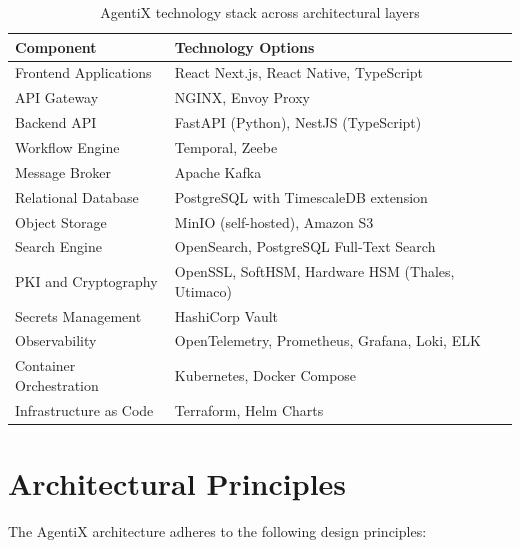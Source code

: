 \documentclass[12pt,oneside,openright,a4paper]{cpe-english-project}
\begin{document}
\begin{table}[h!]
\centering
\footnotesize
\renewcommand{\arraystretch}{1.3}
\begin{tabular}{|p{}|p{}|}
\hline
\textbf{Component} & \textbf{Technology Options} \\ \hline
Frontend Applications & React Next.js, React Native, TypeScript \\ \hline
API Gateway & NGINX, Envoy Proxy \\ \hline
Backend API & FastAPI (Python), NestJS (TypeScript) \\ \hline
Workflow Engine & Temporal, Zeebe \\ \hline
Message Broker & Apache Kafka \\ \hline
Relational Database & PostgreSQL with TimescaleDB extension \\ \hline
Object Storage & MinIO (self-hosted), Amazon S3 \\ \hline
Search Engine & OpenSearch, PostgreSQL Full-Text Search \\ \hline
PKI and Cryptography & OpenSSL, SoftHSM, Hardware HSM (Thales, Utimaco) \\ \hline
Secrets Management & HashiCorp Vault \\ \hline
Observability & OpenTelemetry, Prometheus, Grafana, Loki, ELK \\ \hline
Container Orchestration & Kubernetes, Docker Compose \\ \hline
Infrastructure as Code & Terraform, Helm Charts \\ \hline
\end{tabular}
\vspace{0.6em}
\caption{AgentiX technology stack across architectural layers}
\label{tab:tech-stack}
\end{table}

\vspace{1em}

\section{Architectural Principles}

The AgentiX architecture adheres to the following design principles:
\end{document}
